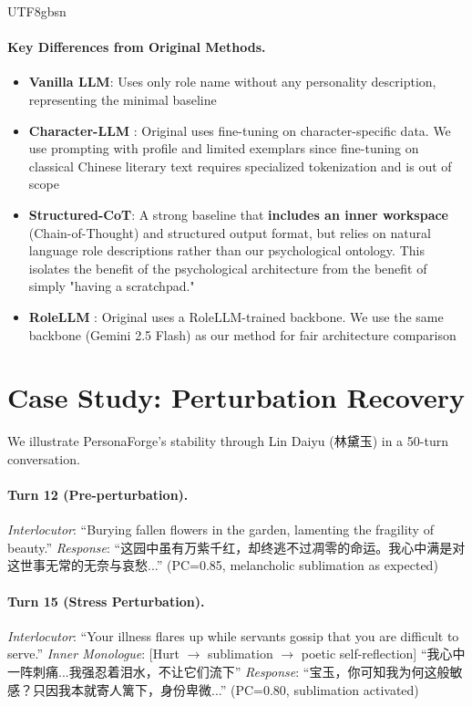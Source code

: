 \documentclass[11pt]{article}
\begin{document}
\begin{CJK*}{UTF8}{gbsn}
\paragraph{Key Differences from Original Methods.}
\begin{itemize}
    \item \textbf{Vanilla LLM}: Uses only role name without any personality description, representing the minimal baseline
    \item \textbf{Character-LLM} \citep{shao2023character}: Original uses fine-tuning on character-specific data. We use prompting with profile and limited exemplars since fine-tuning on classical Chinese literary text requires specialized tokenization and is out of scope
    \item \textbf{Structured-CoT}: A strong baseline that \textbf{includes an inner workspace} (Chain-of-Thought) and structured output format, but relies on natural language role descriptions rather than our psychological ontology. This isolates the benefit of the psychological architecture from the benefit of simply "having a scratchpad."
    \item \textbf{RoleLLM} \citep{wang2024rolellm}: Original uses a RoleLLM-trained backbone. We use the same backbone (Gemini 2.5 Flash) as our method for fair architecture comparison
\end{itemize}


\section{Case Study: Perturbation Recovery}
\label{sec:case}

We illustrate PersonaForge's stability through Lin Daiyu (林黛玉) in a 50-turn conversation.

\paragraph{Turn 12 (Pre-perturbation).}
\textit{Interlocutor}: ``Burying fallen flowers in the garden, lamenting the fragility of beauty.''
\textit{Response}: ``这园中虽有万紫千红，却终逃不过凋零的命运。我心中满是对这世事无常的无奈与哀愁...'' (PC=0.85, melancholic sublimation as expected)

\paragraph{Turn 15 (Stress Perturbation).}
\textit{Interlocutor}: ``Your illness flares up while servants gossip that you are difficult to serve.''
\textit{Inner Monologue}: [Hurt $\rightarrow$ sublimation $\rightarrow$ poetic self-reflection] ``我心中一阵刺痛...我强忍着泪水，不让它们流下''
\textit{Response}: ``宝玉，你可知我为何这般敏感？只因我本就寄人篱下，身份卑微...'' (PC=0.80, sublimation activated)


\end{CJK*}
\end{document}
